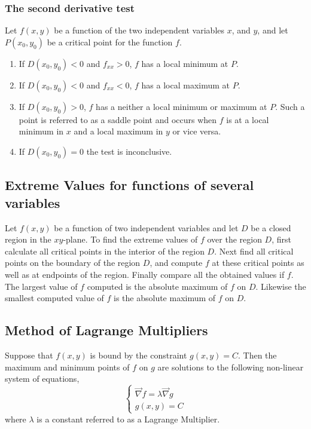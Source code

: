 \documentclass[14pt]{article}
\begin{document}
    \subsubsection{The second derivative test}
    Let $f(x,y)$ be a function of the two independent variables $x$, and
    $y$, and let $P(x_0, y_0)$ be a critical point for the function $f$.
    \begin{enumerate}
        \item If $D(x_0, y_0)<0$ and $f_{xx}>0$, $f$ has a local minimum
        at $P$.
        \item If $D(x_0, y_0)<0$ and $f_{xx}<0$, $f$ has a local maximum
        at $P$.
        \item If $D(x_0, y_0)>0$, $f$ has a neither a local minimum or
        maximum at $P$. Such a point is referred to as a saddle point
        and occurs when $f$ is at a local minimum in $x$ and a local
        maximum in $y$ or vice versa.
        \item If $D(x_0, y_0)=0$ the test is inconclusive.
    \end{enumerate} 
    \subsection{Extreme Values for functions of several variables}
    Let $f(x,y)$ be a function of two independent variables and let $D$
    be a closed region in the $xy$-plane. To find the extreme values of
    $f$ over the region $D$, first calculate all critical points in the
    interior of the region $D$. Next find all critical points on the
    boundary of the region $D$, and compute $f$ at these critical points
    as well as at endpoints of the region. Finally compare all the
    obtained values if $f$. The largest value of $f$ computed is the
    absolute maximum of $f$ on $D$. Likewise the smallest computed value
    of $f$ is the absolute maximum of $f$ on $D$.
    \subsection{Method of Lagrange Multipliers}
    Suppose that $f(x,y)$ is bound by the constraint $g(x,y)=C$. Then
    the maximum and minimum points of $f$ on $g$ are solutions to the
    following non-linear system of equations,
    $$\left\{\begin{array}{lr} \vec\nabla f=\lambda \vec\nabla g\\
        g(x,y)=C \end{array}\right.$$ where $\lambda$ is a constant
    referred to as a Lagrange Multiplier.
\end{document}
